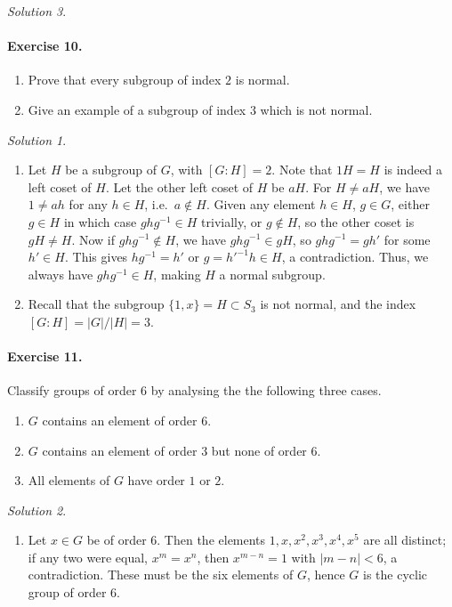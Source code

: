 \documentclass[11pt]{report}
\theoremstyle{remark}
\newtheorem*{solution}{Solution}
\begin{document}
\begin{solution}
    \paragraph{Exercise 10.} \mbox{}
    \begin{enumerate}
        \itemsep0em
        \item Prove that every subgroup of index $2$ is normal.
        \item Give an example of a subgroup of index $3$ which is not normal.
    \end{enumerate}
    \begin{solution} \mbox{}
    \begin{enumerate}
        \item Let $H$ be a subgroup of $G$, with $[G : H] = 2$. Note that $1H = H$
        is indeed a left coset of $H$. Let the other left coset of $H$ be $aH$. For
        $H \neq aH$, we have $1 \neq ah$ for any $h \in H$, i.e.\ $a \notin H$.
        Given any element $h \in H$, $g \in G$, either $g \in H$ in which case
        $ghg^{-1} \in H$ trivially, or $g \notin H$, so the other coset is $gH \neq
        H$. Now if $ghg^{-1} \notin H$, we have $ghg^{-1} \in gH$, so $ghg^{-1} =
        gh'$ for some $h' \in H$. This gives $hg^{-1} = h'$ or $g = h'^{-1}h \in H$,
        a contradiction.  Thus, we always have $ghg^{-1} \in H$, making $H$ a normal
        subgroup.

        \item Recall that the subgroup $\{1, x\} = H\subset S_3$ is not normal, and
        the index $[G:H] = |G| / |H| = 3$.
    \end{enumerate}
    \end{solution}

    \paragraph{Exercise 11.} Classify groups of order $6$ by analysing the the
    following three cases.
    \begin{enumerate}
        \itemsep0em
        \item $G$ contains an element of order $6$.
        \item $G$ contains an element of order $3$ but none of order $6$.
        \item All elements of $G$ have order $1$ or $2$.
    \end{enumerate}
    \begin{solution} \mbox{}
    \begin{enumerate}
        \item Let $x \in G$ be of order $6$. Then the elements $1, x, x^2, x^3, x^4,
        x^5$ are all distinct; if any two were equal, $x^m = x^n$, then $x^{m - n} =
        1$ with $|m - n| < 6$, a contradiction. These must be the six elements of
        $G$, hence $G$ is the cyclic group of order $6$.


\end{enumerate}
\end{solution}
\end{solution}
\end{document}
